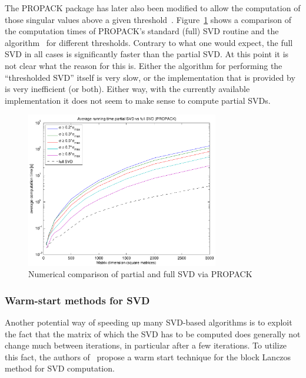 \documentclass{../../common/projectreport}
\begin{document}
The PROPACK package has later also been modified to allow the computation of those singular values above a given threshold~\cite{Lin:2011kx}. Figure~\ref{Algorithms:Discussion:SVD:lasvdThrVSlasvd:figure} shows a comparison of the computation times of PROPACK's standard (full) SVD routine and the algorithm~\cite{Lin:2011kx} for different thresholds. Contrary to what one would expect, the full SVD in all cases is significantly faster than the partial SVD. At this point it is not clear what the reason for this is. Either the algorithm for performing the ``thresholded SVD'' itself is very slow, or the implementation that is provided by~\cite{Lin:2011kx} is very inefficient (or both). Either way, with the currently available implementation it does not seem to make sense to compute partial SVDs. 
%
\begin{figure}[htbp]
\centering
\includegraphics[width=0.75\textwidth]{../figures/thresh_svd_comparison}
\caption{Numerical comparison of partial and full SVD via PROPACK}
\label{Algorithms:Discussion:SVD:lasvdThrVSlasvd:figure}
\end{figure}





%
%


\subsubsection{Warm-start methods for SVD}
\label{Algorithms:Discussion:SVD:WarmstartSVD:Subsubsec}


Another potential way of speeding up many SVD-based algorithms is to exploit the fact that the matrix of which the SVD has to be computed does generally not change much between iterations, in particular after a few iterations. To utilize this fact, the authors of~\cite{Lin:2010uq} propose a warm start technique for the block Lanczos method for SVD computation. 
\end{document}
